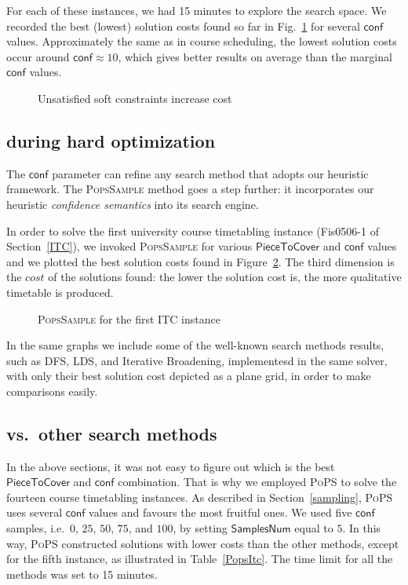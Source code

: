 \documentclass{ws-ijait}
\begin{document}
For each of these instances, we had 15 minutes to explore
the search space. We recorded the best (lowest) solution
costs found so far in Fig.~\ref{CELAR} for several
$\mathsf{conf}$ values. Approximately the same as in course
scheduling, the lowest solution costs occur around
$\mathsf{conf} \approx 10$, which gives better results on
average than the marginal $\mathsf{conf}$ values.

\begin{figure}
  \centering
  
  \caption{Unsatisfied soft constraints increase
           cost\label{CELAR}}
\end{figure}

\subsection{\PopsSample{} during hard
            optimization\label{PoPS}}

The $\mathsf{conf}$ parameter can refine any search method
that adopts our heuristic framework. The \textsc{PopsSample}
method goes a step further: it incorporates our heuristic
\emph{confidence semantics} into its search engine.

In order to solve the first university course timetabling
instance (\textsf{Fis0506-1} of Section~\ref{ITC}), we
invoked \textsc{PopsSample} for various
$\mathsf{PieceToCover}$ and $\mathsf{conf}$ values and we
plotted the best solution costs found in Figure~\ref{ITC1}.
The third dimension is the $cost$ of the solutions found:
the lower the solution cost is, the more qualitative
timetable is produced.

\begin{figure}
  \centering
  
  \caption{{\normalfont\textsc{PopsSample}} for the first
           ITC instance\label{ITC1}}
\end{figure}

In the same graphs we include some of the well-known search
methods results, such as DFS, LDS, and Iterative Broadening,
implementesd in the same solver, with only their best
solution cost depicted as a plane grid, in order to make
comparisons easily.

\subsection{\PoPS{} vs.\ other search methods}

In the above sections, it was not easy to figure out which
is the best $\mathsf{PieceToCover}$ and $\mathsf{conf}$
combination. That is why we employed \textsc{PoPS} to solve
the fourteen course timetabling instances. As described in
Section~\ref{sampling}, \textsc{PoPS} uses several
$\mathsf{conf}$ values and favours the most fruitful ones.
We used five $\mathsf{conf}$ samples, i.e.\ $0$, $25$, $50$,
$75$, and $100$, by setting $\mathsf{SamplesNum}$ equal to
$5$. In this way, \textsc{PoPS} constructed solutions with
lower costs than the other methods, except for the fifth
instance, as illustrated in Table~\ref{PopsItc}. The time
limit for all the methods was set to 15 minutes.
\end{document}
